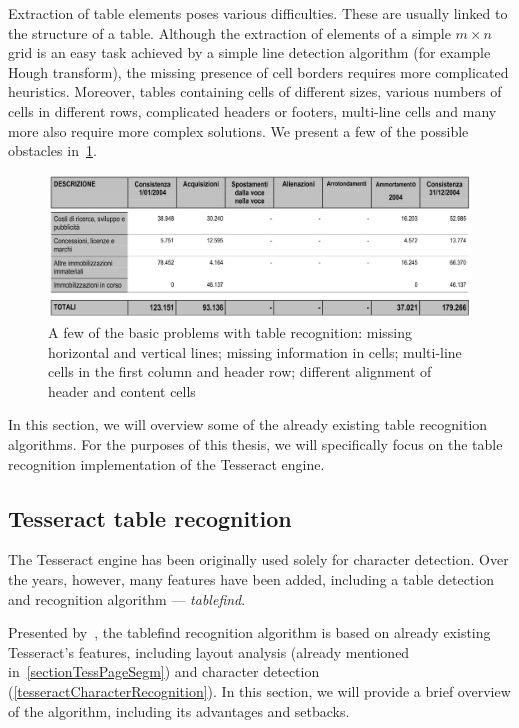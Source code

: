 Extraction of table elements poses various difficulties. These are usually linked to the structure of a table. Although the extraction of elements of a simple $m{\times}n$ grid is an easy task achieved by a simple line detection algorithm (for example Hough transform), the missing presence of cell borders requires more complicated heuristics. Moreover, tables containing cells of different sizes, various numbers of cells in different rows, complicated headers or footers, multi-line cells and many more also require more complex solutions. We present a few of the possible obstacles in~\cref{fig:tableRecognitionObstacles}.

\begin{figure}[t]
\centering
\includegraphics[width=0.7\linewidth]{img/tableDetection/recognitionProblematic.jpg}
\caption{A few of the basic problems with table recognition: missing horizontal and vertical lines; missing information in cells; multi-line cells in the first column and header row; different alignment of header and content cells }
\label{fig:tableRecognitionObstacles}
\end{figure}

In this section, we will overview some of the already existing table recognition algorithms. For the purposes of this thesis, we will specifically focus on the table recognition implementation of the Tesseract engine.

\subsection{Tesseract table recognition}

The Tesseract engine has been originally used solely for character detection. Over the years, however, many features have been added, including a table detection and recognition algorithm --- \emph{tablefind}.

Presented by~\citet{tableDetHeterogeneous}, the tablefind recognition algorithm is based on already existing Tesseract's features, including layout analysis (already mentioned in~\cref{sectionTessPageSegm}) and character detection (\cref{tesseractCharacterRecognition}). In this section, we will provide a brief overview of the algorithm, including its advantages and setbacks.

